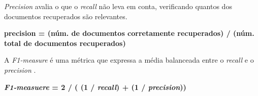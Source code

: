 \emph{Precision} avalia o que o \emph{recall} não leva em conta, verificando quantos dos documentos recuperados são relevantes.
\begin{center}
\textbf{
precision = (núm. de documentos corretamente recuperados) / (núm. total de documentos recuperados)
}
\end{center}

A \emph{F1-measure} é uma métrica que expressa a média balanceada entre o \emph{recall} e o \emph{precision} \cite{Feldman2007}.
\begin{center}
\textbf{
\emph{F1-measuere} = 2 / ( (1 / \emph{recall}) + (1 / \emph{precision}))
}
\end{center}

